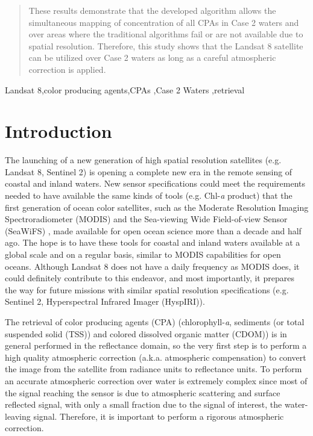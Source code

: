 \documentclass[onecolumn,3p,letterpaper]{elsarticle}
\begin{document}
\begin{frontmatter}
\begin{abstract}
These results demonstrate that the developed algorithm allows the simultaneous mapping of concentration of all CPAs in Case 2 waters and over areas where the traditional algorithms fail or are not available due to spatial resolution.
%
Therefore, this study shows that the Landsat 8 satellite can be utilized over Case 2 waters as long as a careful atmospheric correction is applied. 

\end{abstract}

\begin{keyword}
Landsat 8\sep color producing agents\sep CPAs \sep Case 2 Waters \sep retrieval
\end{keyword}

\end{frontmatter}
\section{Introduction}
The launching of a new generation of high spatial resolution satellites (e.g. Landsat 8, Sentinel 2) is opening a complete new era in the remote sensing of coastal and inland waters. New sensor specifications could meet the requirements needed to have available the same kinds of tools (e.g. Chl-{\it a} product) that the first generation of ocean color satellites, such as the Moderate Resolution Imaging Spectroradiometer (MODIS) \citep{Esaias1998} and the Sea-viewing Wide Field-of-view Sensor (SeaWiFS) \citep{McClain2004}, made available for open ocean science more than a decade and half ago. The hope is to have these tools for coastal and inland waters available at a global scale and on a regular basis, similar to MODIS capabilities for open oceans. Although Landsat 8 does not have a daily frequency as MODIS does, it could definitely contribute to this endeavor, and most importantly, it prepares the way for future missions with similar spatial resolution specifications (e.g. Sentinel 2, Hyperspectral Infrared Imager (HyspIRI)).

The retrieval of color producing agents (CPA) (chlorophyll-{\it a}, sediments (or total suspended solid (TSS)) and colored dissolved organic matter (CDOM)) is in general performed in the reflectance domain, so the very first step is to perform a high quality atmospheric correction (a.k.a. atmospheric compensation) to convert the image from the satellite from radiance units to reflectance units. To perform an accurate atmospheric correction over water is extremely complex since most of the signal reaching the sensor is due to atmospheric scattering and surface reflected signal, with only a small fraction due to the signal of interest, the water-leaving signal. Therefore, it is important to perform a rigorous atmospheric correction. 
\end{document}
